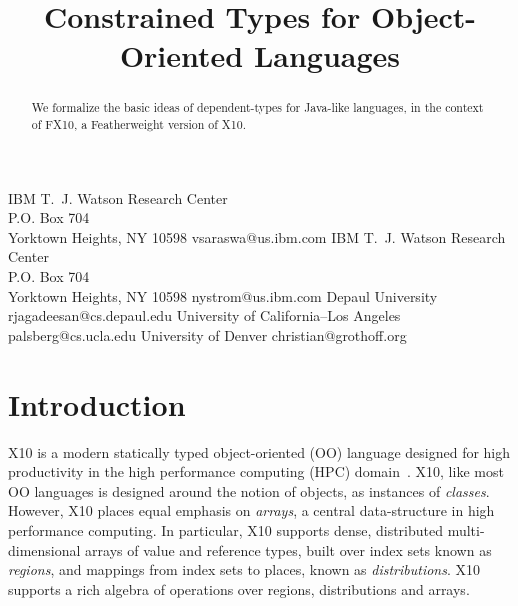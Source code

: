 \documentclass[nocopyrightspace,preprint,9pt]{sigplanconf}
\newcommand\Xten{{X10}}
\newcommand\FXten{{FX10}}
\begin{document}
\title{Constrained Types for Object-Oriented Languages}
  {IBM T.~J. Watson Research Center \\
   P.O. Box 704 \\
   Yorktown Heights, NY 10598}
  {vsaraswa@us.ibm.com}
  {IBM T.~J. Watson Research Center \\
   P.O. Box 704 \\
   Yorktown Heights, NY 10598}
  {nystrom@us.ibm.com}
  {Depaul University}
  {rjagadeesan@cs.depaul.edu}
  {University of California--Los Angeles}
  {palsberg@cs.ucla.edu}
  {University of Denver}
  {christian@grothoff.org}

\maketitle


\begin{abstract}
We formalize the basic ideas of dependent-types for Java-like
languages, in the context of \FXten, a Featherweight version of \Xten{}.
\end{abstract}

\section{Introduction}

%

%
%
%

\Xten{} is a modern statically typed object-oriented (OO) language
designed for high productivity in the high performance computing (HPC)
domain~\cite{X10}. \Xten{}, like most OO languages is designed around the notion
of objects, as instances of {\em classes}. However, \Xten{} places
equal emphasis on {\em arrays}, a central data-structure in high
performance computing. In particular, \Xten{} supports dense,
distributed multi-dimensional arrays of value and reference types,
built over index sets known as {\em regions}, and mappings from index
sets to places, known as {\em distributions}.  \Xten{} supports a rich
algebra of operations over regions, distributions and arrays.
\end{document}
